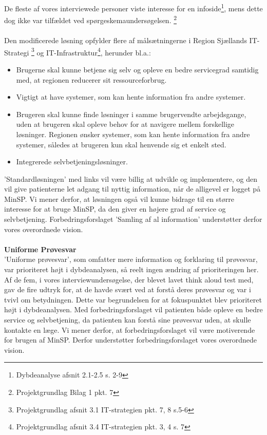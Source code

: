 De fleste af vores interviewede personer viste interesse for en infoside\footnote{Dybdeanalyse afsnit 2.1-2.5 s. 2-9}, mens dette dog ikke var tilfældet ved spørgeskemaundersøgelsen. \footnote{Projektgrundlag Bilag 1 pkt. 7}\\
\\
Den modificerede løsning opfylder flere af målsætningerne i Region Sjællands IT-Strategi \footnote{Projektgrundlag afsnit 3.1 IT-strategien pkt. 7, 8  s.5-6} og IT-Infrastruktur\footnote{Projektgrundlag afsnit 3.4 IT-strategien pkt. 3, 4 s. 7}, herunder bl.a.: 
\begin{itemize}
\item Brugerne skal kunne betjene sig selv og opleve en bedre servicegrad samtidig med, at regionen reducerer sit ressourceforbrug.
\item Vigtigt at have systemer, som kan hente information fra andre systemer. 
\item Brugeren skal kunne finde løsninger i samme brugervendte arbejdsgange, uden at brugeren skal opleve behov for at navigere mellem forskellige løsninger. Regionen ønsker systemer, som kan hente information fra andre systemer, således at brugeren kun skal henvende sig et enkelt sted.
\item Integrerede selvbetjeningsløsninger.
\end{itemize}
'Standardløsningen' med links vil være billig at udvikle og implementere, og den vil give patienterne let adgang til nyttig information, når de alligevel er logget på MinSP. Vi mener derfor, at løsningen også vil kunne bidrage til en større interesse for at bruge MinSP, da den giver en højere grad af service og selvbetjening. Forbedringsforslaget 'Samling af al information' understøtter derfor vores overordnede vision.\\
\\
\textbf{Uniforme Prøvesvar}\\
’Uniforme prøvesvar’, som omfatter mere information og forklaring til prøvesvar, var prioriteret højt i dybdeanalysen, så reelt ingen ændring af prioriteringen her. Af de fem, i vores interviewundersøgelse, der blevet lavet think aloud test med, gav de fire udtryk for, at de havde svært ved at forstå deres prøvesvar og var i tvivl om betydningen. Dette var begrundelsen for at fokuspunktet blev prioriteret højt i dybdeanalysen. Med forbedringsforslaget vil patienten både opleve en bedre service og selvbetjening, da patienten kan forstå sine prøvesvar uden, at skulle kontakte en læge. Vi mener derfor, at forbedringsforslaget vil være motiverende for brugen af MinSP. Derfor understøtter forbedringsforslaget vores overordnede vision. %

